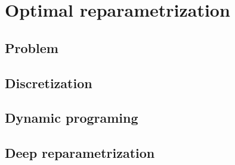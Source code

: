 
\section{Optimal reparametrization}
\subsection{Problem }
\subsection{Discretization}

\subsection{Dynamic programing}
\subsection{Deep reparametrization}